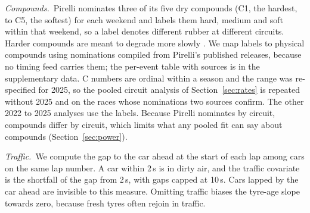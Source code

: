 \medskip\noindent\textit{Compounds.}\ Pirelli nominates three of its five dry compounds (C1, the hardest, to C5, the softest) for each weekend and labels them hard, medium and soft within that weekend, so a label denotes different rubber at different circuits.
Harder compounds are meant to degrade more slowly \citep[pp.~2, 9]{cappelloHoegh2026}.
We map labels to physical compounds using nominations compiled from Pirelli's published releases, because no timing feed carries them; the per-event table with sources is in the supplementary data.
C numbers are ordinal within a season and the range was re-specified for 2025, so the pooled circuit analysis of Section~\ref{sec:rates} is repeated without 2025 and on the \SensVerifiedNEvents{} races whose nominations two sources confirm.
The other 2022 to 2025 analyses use the labels.
Because Pirelli nominates by circuit, compounds differ by circuit, which limits what any pooled fit can say about compounds (Section~\ref{sec:power}).

\medskip\noindent\textit{Traffic.}\ We compute the gap to the car ahead at the start of each lap among cars on the same lap number.
A car within 2\,s is in dirty air, and the traffic covariate is the shortfall of the gap from 2\,s, with gaps capped at 10\,s.
Cars lapped by the car ahead are invisible to this measure.
Omitting traffic biases the tyre-age slope towards zero, because fresh tyres often rejoin in traffic.
